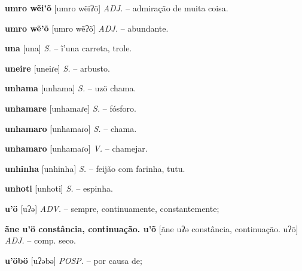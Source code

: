 \textbf{umro wẽi'õ} [umro wẽiʔõ] \textit{ADJ.} -- admiração de muita coisa.

\textbf{umro wẽ'õ} [umro wẽʔõ] \textit{ADJ.} -- abundante.

\textbf{una} [una] \textit{S.} -- ĩ'una carreta, trole.

\textbf{uneire} [uneiɾe] \textit{S.} -- arbusto.

\textbf{unhama} [unhama] \textit{S.} -- uzö chama.

\textbf{unhamare} [unhamaɾe] \textit{S.} -- fósforo.

\textbf{unhamaro} [unhamaɾo] \textit{S.} -- chama.

\textbf{unhamaro} [unhamaɾo] \textit{V.} -- chamejar.

\textbf{unhinha} [unhinha] \textit{S.} -- feijão com farinha, tutu.

\textbf{unhoti} [unhoti] \textit{S.} -- espinha.

\textbf{u'ö} [uʔə] \textit{ADV.} -- sempre, continuamente, constantemente;

\textbf{ãne u'ö constância, continuação. u'õ} [ãne uʔə constância, continuação. uʔõ] \textit{ADJ.} -- comp. seco.

\textbf{u'öbö} [uʔəbə] \textit{POSP.} -- por causa de;

